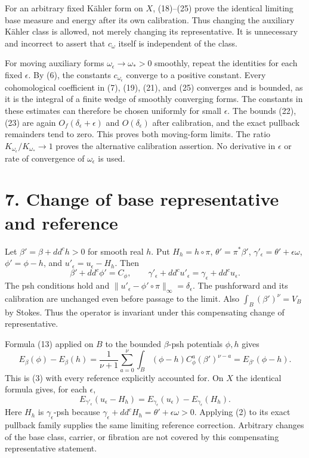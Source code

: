 \documentclass[
  11pt,
]{article}
\begin{document}
For an arbitrary fixed Kähler form on \(X\), (18)--(25) prove the identical limiting base measure and energy after its own calibration. Thus changing the auxiliary Kähler class is allowed, not merely changing its representative. It is unnecessary and incorrect to assert that \(c_\omega\) itself is independent of the class.

For moving auxiliary forms \(\omega_\epsilon\to\omega_*>0\) smoothly, repeat the identities for each fixed \(\epsilon\). By (6), the constants \(c_{\omega_\epsilon}\) converge to a positive constant. Every cohomological coefficient in (7), (19), (21), and (25) converges and is bounded, as it is the integral of a finite wedge of smoothly converging forms. The constants in these estimates can therefore be chosen uniformly for small \(\epsilon\). The bounds (22), (23) are again \(O_f(\delta_\epsilon+\epsilon)\) and \(O(\delta_\epsilon)\) after calibration, and the exact pullback remainders tend to zero. This proves both moving-form limits. The ratio \(K_{\omega_\epsilon}/K_{\omega_*}\to1\) proves the alternative calibration assertion. No derivative in \(\epsilon\) or rate of convergence of \(\omega_\epsilon\) is used.

\section{7. Change of base representative and reference}\label{change-of-base-representative-and-reference}

Let \(\beta'=\beta+dd^ch>0\) for smooth real \(h\). Put \(H_h=h\circ\pi\), \(\theta'=\pi^*\beta'\), \(\gamma'_\epsilon=\theta'+\epsilon\omega\), \(\phi'=\phi-h\), and \(u'_\epsilon=u_\epsilon-H_h\). Then \[
\beta'+dd^c\phi'=C_\phi,\qquad
\gamma'_\epsilon+dd^cu'_\epsilon=\gamma_\epsilon+dd^cu_\epsilon.
\] The psh conditions hold and \(\|u'_\epsilon-\phi'\circ\pi\|_\infty=\delta_\epsilon\). The pushforward and its calibration are unchanged even before passage to the limit. Also \(\int_B(\beta')^\nu=V_B\) by Stokes. Thus the operator is invariant under this compensating change of representative.

Formula (13) applied on \(B\) to the bounded \(\beta\)-psh potentials \(\phi,h\) gives \[
E_\beta(\phi)-E_\beta(h)
=\frac1{\nu+1}\sum_{a=0}^{\nu}\int_B(\phi-h)C_\phi^a(\beta')^{\nu-a}
=E_{\beta'}(\phi-h).
\] This is (3) with every reference explicitly accounted for. On \(X\) the identical formula gives, for each \(\epsilon\), \[
E_{\gamma'_\epsilon}(u_\epsilon-H_h)
=E_{\gamma_\epsilon}(u_\epsilon)-E_{\gamma_\epsilon}(H_h).
\] Here \(H_h\) is \(\gamma_\epsilon\)-psh because \(\gamma_\epsilon+dd^cH_h=\theta'+\epsilon\omega>0\). Applying (2) to its exact pullback family supplies the same limiting reference correction. Arbitrary changes of the base class, carrier, or fibration are not covered by this compensating representative statement.
\end{document}
